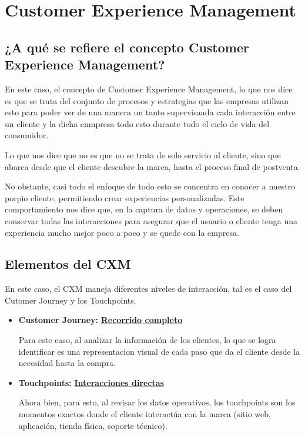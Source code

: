 \documentclass[letterpaper,11pt]{article}
\begin{document}


\newpage
{\hypersetup{linkcolor=black}\tableofcontents}


\newpage

\setcounter{page}{1}
\singlespacing

\section{Customer Experience Management}

\subsection{¿A qué se refiere el concepto Customer Experience Management?}

En este caso, el concepto de
Customer Experience Management, 
lo que nos dice es que se trata del conjunto de procesos 
y estrategias que las empresas utilizan
esto para poder ver de una manera un tanto
supervisaada cada interacción entre un cliente 
y la dicha enmpresa 
todo esto durante todo el ciclo de vida del consumidor. 

Lo que nos dice que no es 
que no se trata de solo servicio al cliente, 
sino que abarca desde que el cliente descubre la marca, 
hasta el proceso final de postventa.

No obstante, 
casi todo el enfoque de todo esto 
se concentra en conocer a nuestro porpio cliente, 
permitiendo crear experiencias personalizadas. 
Este comportamiento nos dice que, en la captura de datos y operaciones, se deben conservar todas las interacciones para
asegurar que el usuario o cliente tenga una experiencia mucho mejor poco a poco y se quede con la empresa. 

\subsection{Elementos del CXM}

En este caso, el CXM maneja diferentes niveles de interacción, tal es el caso 
del Cutomer Journey y los Touchpoints.

\begin{itemize}
    \item \textbf{Customer Journey:} \underline{\hspace{0.5cm}\textbf{Recorrido completo}\hspace{0.5cm}} 
    
    Para este caso, al analizar la información de los clientes, 
    lo que se logra identificar es una representacion
    visual de cada paso que da el cliente 
    desde la necesidad hasta la compra. 
    
    
    \item \textbf{Touchpoints:} \underline{\hspace{0.5cm}\textbf{Interacciones directas}\hspace{0.5cm}}
    
    Ahora bien, para esto, 
    al revisar los datos operativos, 
    los touchpoints son los momentos exactos donde 
    el cliente interactúa con la marca 
    (sitio web, aplicación, tienda física, soporte técnico).

\end{itemize}
\end{document}
